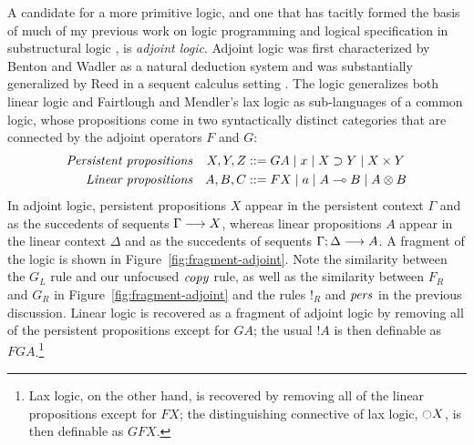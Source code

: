 A candidate for a more primitive logic, and one that has tacitly
formed the basis of much of my previous work on logic programming and
logical specification in substructural logic
\cite{pfenning09substructural,simmons11weak,simmons11logical}, 
is {\it adjoint logic}.
Adjoint logic was first characterized by Benton and Wadler as a
natural deduction system \cite{benton96linear} and was substantially
generalized by Reed in a sequent calculus setting
\cite{reed09judgmental}. The logic generalizes both linear logic and
Fairtlough and Mendler's lax logic \cite{fairtlough95propositional}
as sub-languages of a common logic, whose propositions come
in two syntactically distinct categories that are connected by the
adjoint operators $F$ and $G$:
\begin{align*}
\mbox{\it Persistent propositions} & &
X, Y, Z & ::= G A \mid x \mid X \supset Y \mid X \times Y\\
\mbox{\it Linear propositions} & & 
A, B, C & ::= F X \mid a \mid A \multimap B \mid A \otimes B
\end{align*}
In adjoint logic, persistent propositions $X$ appear in the
persistent context $\Gamma$ and as the succedents of sequents
${\Gamma} \longrightarrow {X} \mathstrut$, whereas linear propositions $A$ appear in
the linear context $\Delta$ and as the succedents of sequents
${\Gamma};{\Delta} \longrightarrow {A} \mathstrut$. A fragment of the logic is shown in
Figure~\ref{fig:fragment-adjoint}.  Note the similarity between the
$G_L$ rule and our unfocused ${\it copy}$ rule, as well as the
similarity between $F_R$ and $G_R$ in
Figure~\ref{fig:fragment-adjoint} and the rules ${!}_R$ and ${\it
  pers}$ in the previous discussion.  Linear logic is recovered as a
fragment of adjoint logic by removing all of the persistent
propositions except for $GA$; the usual ${!}A$ is then definable as
$FGA$.\footnote{Lax logic, on the other hand, is recovered by removing
  all of the linear propositions except for $FX$; the distinguishing
  connective of lax logic, $\ocircle X$, is then definable as $GFX$.}

